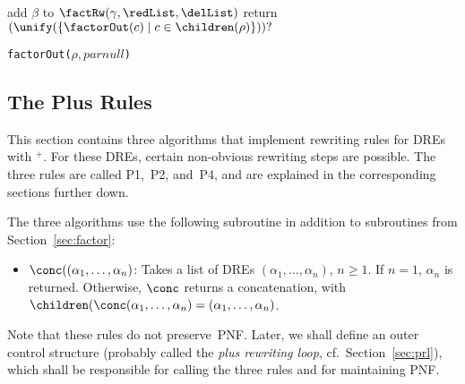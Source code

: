 \documentclass[a4paper,11pt, svgnames,titlepage]{article}
\newcommand{\rxp}{{^\mathtt{+}}}
\newcommand{\rxo}{\mathtt{?}}
\DeclareMathOperator{\eqModEw}{=_{\emptyword}}
\newcommand{\emptyword}{\varepsilon}
\begin{document}
\begin{algorithm2e}[H]
{{{				
				{
					\lIf{$L(\unify(F))\eqModEw L(p_\gamma)$}{$\delList\leftarrow F$}
				}
				{
					\lIf{$L(\unify(F))\eqModEw L(p_\gamma)$}{$\delList\leftarrow F$} %
				}
				\Else
				{
				}
				\ForEach{$\beta\in(\children(\rho)\setminus(\{\gamma\}\cup\delList))$}
				{
					{add $\beta$ to \redList}
				}
				\If{$(\redList\cup\delList)\neq \emptyset$}
				{
					$\factRw(\gamma,\redList,\delList)$\;
				}
			}
		}
		{
			return $(\unify(\{\factorOut(c)\mid c\in\children(\rho)\}))\rxo$\;
		}
	}
	\caption{\texttt{factorOut(}$\rho,parnull$\texttt{)}}
\end{algorithm2e}
\subsection{The Plus Rules}\label{sec:prules}
This section contains three algorithms that implement rewriting rules for DREs with $\rxp$. For these DREs, certain non-obvious rewriting steps are possible. The three rules are called P1,~P2, and~P4, and are explained in the corresponding sections further down.

The three algorithms use the following subroutine in addition to subroutines from Section~\ref{sec:factor}:
\begin{itemize}
	\item $\conc((\alpha_1,\ldots,\alpha_n)$: Takes a list of DREs $(\alpha_1,\ldots,\alpha_n)$, $n\geq 1$. If $n=1$, $\alpha_n$ is returned. Otherwise, $\conc$ returns a concatenation, with $\children(\conc(\alpha_1,\ldots,\alpha_n)=(\alpha_1,\ldots,\alpha_n)$.
\end{itemize}

Note that these rules do not preserve~PNF. Later, we shall define an outer control structure (probably called the \emph{plus rewriting loop}, cf.\ Section~\ref{sec:prl}), which shall be responsible for calling the three rules and for maintaining PNF.
\end{document}
